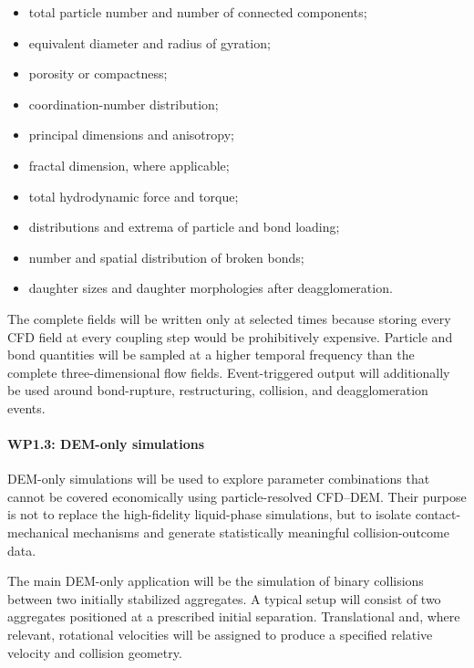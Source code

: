 \documentclass[11pt,a4paper,twoside]{scrartcl}
\begin{document}
\begin{itemize}
	\item total particle number and number of connected components;
	
	\item equivalent diameter and radius of gyration;
	
	\item porosity or compactness;
	
	\item coordination-number distribution;
	
	\item principal dimensions and anisotropy;
	
	\item fractal dimension, where applicable;
	
	\item total hydrodynamic force and torque;
	
	\item distributions and extrema of particle and bond loading;
	
	\item number and spatial distribution of broken bonds;
	
	\item daughter sizes and daughter morphologies after deagglomeration.
\end{itemize}

The complete fields will be written only at selected times because storing every CFD field at every coupling step would be prohibitively expensive. Particle and bond quantities will be sampled at a higher temporal frequency than the complete three-dimensional flow fields. Event-triggered output will additionally be used around bond-rupture, restructuring, collision, and deagglomeration events.

\paragraph{WP1.3: DEM-only simulations}

DEM-only simulations will be used to explore parameter combinations that cannot be covered economically using particle-resolved CFD--DEM. Their purpose is not to replace the high-fidelity liquid-phase simulations, but to isolate contact-mechanical mechanisms and generate statistically meaningful collision-outcome data.

The main DEM-only application will be the simulation of binary collisions between two initially stabilized aggregates. A typical setup will consist of two aggregates positioned at a prescribed initial separation. Translational and, where relevant, rotational velocities will be assigned to produce a specified relative velocity and collision geometry.
\end{document}
